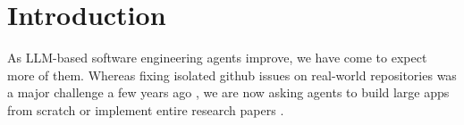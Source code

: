 \section{Introduction}
\label{sec:introduction}


As LLM-based software engineering agents improve, we have come to expect more of them.
Whereas fixing isolated github issues on real-world repositories was a major challenge a few years ago \citep{jimenez2023swe,yang2024swe,wang2024openhands}, we are now asking agents to build large apps from scratch \citep{zhao2024commit0} or implement entire research papers \citep{starace2025paperbench}.


